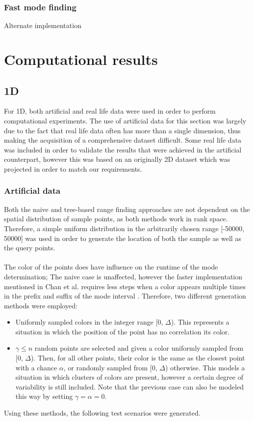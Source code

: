 \documentclass{article}
\begin{document}
\subsubsection{Fast mode finding}
\cite{cgal:numbertypes} \cite{cgal:arrangement} \cite{cgal:foundations}
Alternate implementation
\section{Computational results}
\subsection{1D}
For 1D, both artificial and real life data were used in order to perform computational experiments. The use of artificial data for this section was largely due to the fact that real life data often has more than a single dimension, thus making the acquisition of a comprehensive dataset difficult. Some real life data was included in order to validate the results that were achieved in the artificial counterpart, however this was based on an originally 2D dataset which was projected in order to match our requirements.
\subsubsection*{Artificial data}
Both the naive and tree-based range finding approaches are not dependent on the spatial distribution of sample points, as both methods work in rank space. Therefore, a simple uniform distribution in the arbitrarily chosen range [-50000, 50000] was used in order to generate the location of both the sample as well as the query points.  \\\\
The color of the points does have influence on the runtime of the mode determination; The naive case is unaffected, however the faster implementation mentioned in Chan et al. requires less steps when a color appears multiple times in the prefix and suffix of the mode interval \cite{Chan2014}. Therefore, two different generation methods were employed:
\begin{itemize}
    \item Uniformly sampled colors in the integer range [0, $\Delta$). This represents a situation in which the position of the point has no correlation its color. 
    \item $\gamma \leq n$ random points are selected and given a color uniformly sampled from [0, $\Delta$). Then, for all other points, their color is the same as the closest point with a chance $\alpha$, or randomly sampled from [0, $\Delta$) otherwise. This models a situation in which clusters of colors are present, however a certain degree of variability is still included. Note that the previous case can also be modeled this way by setting $\gamma=\alpha=0$.
\end{itemize}
Using these methods, the following test scenarios were generated. \\
\end{document}
